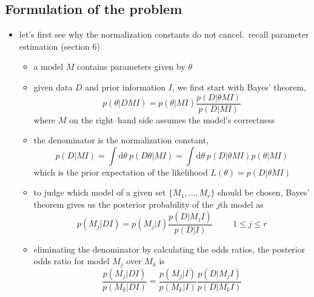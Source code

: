 \documentclass[../jaynes_prob_theory_notes.tex]{subfiles}
\begin{document}
        \subsection{Formulation of the problem}
            \begin{itemize} 
                \item let's first see why the normalization constants do not cancel.\ recall parameter estimation (section 6)
                    \begin{itemize} 
                        \item a model \(M\) contains parameters given by \(\theta\)
                        \item given data \(D\) and prior information \(I\), we first start with Bayes' theorem,
                            \begin{equation*} 
                                p(\theta |DMI) = p(\theta |MI) \frac{p(D|\theta MI)}{p(D|MI)}
                            \end{equation*}
                            where \(M\) on the right--hand side assumes the model's correctness
                        \item the denominator is the normalization constant,
                            \begin{equation*} 
                                p(D|MI) = \int \text{d}\theta~p(D \theta | MI) = \int \text{d}\theta~p(D|\theta MI)p(\theta |MI)
                            \end{equation*}
                            which is the prior expectation of the likelihood \(L(\theta) = p(D|\theta MI)\)
                        \item to judge which model of a given set \(\{M_1, \ldots, M_r\}\) should be chosen, Bayes' theorem gives us the posterior probability of the \(j\)th model as
                            \begin{equation*} 
                                p(M_j | DI) = p(M_j | I) \frac{p(D|M_j I)}{p(D|I)} \hspace{1cm} 1 \leq j \leq r
                            \end{equation*}
                        \item eliminating the denominator by calculating the odds ratios, the posterior odds ratio for model \(M_j\) over \(M_k\) is 
                            \begin{equation*} 
                                \frac{p(M_j|DI)}{p(M_k|DI)} = \frac{p(M_j|I)}{p(M_k|I)}\frac{p(D|M_j I)}{p(D|M_k I)}

\end{equation*}
\end{itemize}
\end{itemize}
\end{document}
